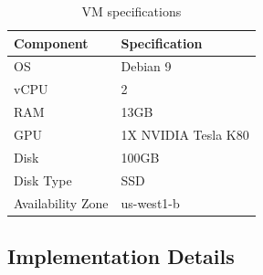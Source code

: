\documentclass{article}
\begin{document}
\begin{table}[h]
	\centering
	\begin{tabular}{|l|l|} 
		\hline
		\textbf{Component} & \textbf{Specification}  \\ 
		\hline
		OS                 & Debian 9                \\
		vCPU               & 2                       \\
		RAM                & 13GB                    \\
		GPU                & 1X NVIDIA Tesla K80     \\
		Disk               & 100GB                   \\
		Disk Type          & SSD                     \\
		Availability Zone  & us-west1-b              \\
		\hline
	\end{tabular}
	\caption{VM specifications}
   	\label{tab:specVM}
\end{table}

\subsection{Implementation Details}\label{ImplDet}
\end{document}
